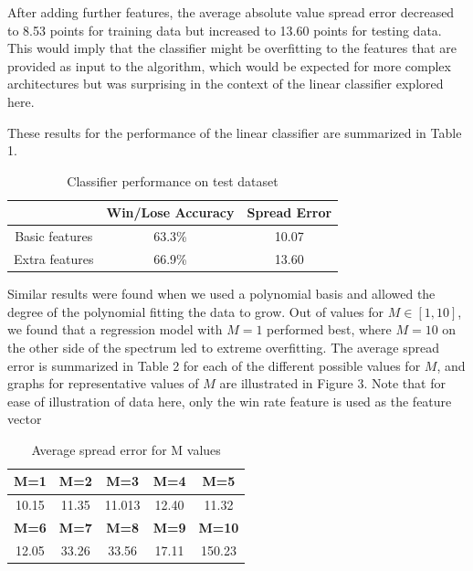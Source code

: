 \documentclass{article}
\begin{document}
After adding further features, the average absolute value spread error decreased to 8.53 points for training data but increased to 13.60 points for testing data. This would imply that the classifier might be overfitting to the features that are provided as input to the algorithm, which would be expected for more complex architectures but was surprising in the context of the linear classifier explored here.

These results for the performance of the linear classifier are summarized in Table 1.
\begin{table}
  \begin{center}
    \begin{tabular}{ | c | c | c | }
      \hline
                      & Win/Lose Accuracy & Spread Error  \\ \hline
      Basic features  & 63.3\%            & 10.07         \\ \hline
      Extra features  & 66.9\%            & 13.60         \\ \hline
    \end{tabular}
  \end{center}
  \caption{Classifier performance on test dataset}
\end{table}

Similar results were found when we used a polynomial basis and allowed the degree of the polynomial fitting the data to grow. Out of values for $M \in [1, 10]$, we found that a regression model with $M=1$ performed best, where $M=10$ on the other side of the spectrum led to extreme overfitting. The average spread error is summarized in Table 2 for each of the different possible values for $M$, and graphs for representative values of $M$ are illustrated in Figure 3. Note that for ease of illustration of data here, only the win rate feature is used as the feature vector

\begin{table}
  \begin{center}
    \begin{tabular}{ | c | c | c | c | c | }
      \hline
      \textbf{M=1}    & \textbf{M=2}    & \textbf{M=3}     & \textbf{M=4}     & \textbf{M=5}      \\ \hline
      10.15  & 11.35  & 11.013  & 12.40   & 11.32    \\ \hline
      \textbf{M=6}    & \textbf{M=7}    & \textbf{M=8}     & \textbf{M=9}     & \textbf{M=10}     \\ \hline
      12.05  & 33.26  & 33.56   & 17.11   & 150.23   \\ \hline
    \end{tabular}
  \end{center}
  \caption{Average spread error for M values}
\end{table}
\end{document}
